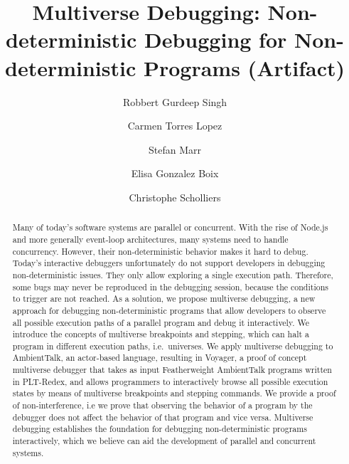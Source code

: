\documentclass[a4paper,UKenglish]{darts-v2019}
\title{Multiverse Debugging: Non-deterministic Debugging for Non-deterministic Programs (Artifact)} %
\author{Robbert Gurdeep Singh}{Universiteit Gent, Belgium}{Robbert.GurdeepSingh@ugent.be}{}{Doctoral fellowship from the Special Research Fund (BOF) of Ghent University (reference number: BOF18/DOC/327)}
\author{Carmen Torres Lopez}{Vrije Universiteit Brussel, Belgium}{ctorresl@vub.be}{}{FWO Research Foundation Flanders (FWO) grant, project number G004816N.}
\author{Stefan Marr}{School of Computing University of Kent, United Kingdom}{s.marr@kent.ac.uk}{}{}%
\author{Elisa Gonzalez Boix}{Vrije Universiteit Brussel, Belgium}{egonzale@vub.be}{}{}%
\author{Christophe Scholliers}{Universiteit Gent, Belgium}{Christophe.Scholliers@ugent.be}{}{}%
\begin{document}
\maketitle

\begin{abstract}
Many of today's software systems are parallel or concurrent. With the
rise of Node.js and more generally event-loop architectures, many
systems need to handle concurrency. However, their non-deterministic
behavior makes it hard to debug. Today's interactive debuggers
unfortunately do not support developers in debugging non-deterministic
issues. They only allow exploring a single execution path. Therefore,
some bugs may never be reproduced in the debugging session, because the
conditions to trigger are not reached. As a solution, we propose
multiverse debugging, a new approach for debugging non-deterministic
programs that allow developers to observe all possible execution paths
of a parallel program and debug it interactively. We introduce the
concepts of multiverse breakpoints and stepping, which can halt a
program in different execution paths, i.e.~universes. We apply
multiverse debugging to AmbientTalk, an actor-based language, resulting
in Voyager, a proof of concept multiverse debugger that takes as
input Featherweight AmbientTalk programs written in PLT-Redex, and
allows programmers to interactively browse all possible execution states
by means of multiverse breakpoints and stepping commands. We provide a
proof of non-interference, i.e we prove that observing the behavior of a
program by the debugger does not affect the behavior of that program and
vice versa. Multiverse debugging establishes the foundation for
debugging non-deterministic programs interactively, which we believe can
aid the development of parallel and concurrent systems.
 \end{abstract}

\end{document}
